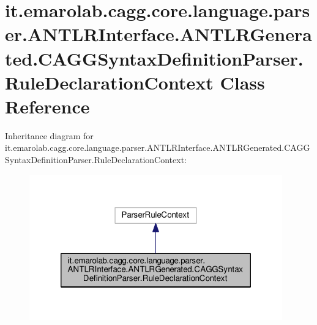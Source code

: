 \hypertarget{classit_1_1emarolab_1_1cagg_1_1core_1_1language_1_1parser_1_1ANTLRInterface_1_1ANTLRGenerated_1_632d39d35185b34ff726726c3c8fa6b6}{\section{it.\-emarolab.\-cagg.\-core.\-language.\-parser.\-A\-N\-T\-L\-R\-Interface.\-A\-N\-T\-L\-R\-Generated.\-C\-A\-G\-G\-Syntax\-Definition\-Parser.\-Rule\-Declaration\-Context Class Reference}
\label{classit_1_1emarolab_1_1cagg_1_1core_1_1language_1_1parser_1_1ANTLRInterface_1_1ANTLRGenerated_1_632d39d35185b34ff726726c3c8fa6b6}
}


Inheritance diagram for it.\-emarolab.\-cagg.\-core.\-language.\-parser.\-A\-N\-T\-L\-R\-Interface.\-A\-N\-T\-L\-R\-Generated.\-C\-A\-G\-G\-Syntax\-Definition\-Parser.\-Rule\-Declaration\-Context\-:
\nopagebreak
\begin{figure}[H]
\begin{center}
\leavevmode
\includegraphics[width=310pt]{classit_1_1emarolab_1_1cagg_1_1core_1_1language_1_1parser_1_1ANTLRInterface_1_1ANTLRGenerated_1_bcd5316e45a46c837848e1ea9717b63a}
\end{center}
\end{figure}


